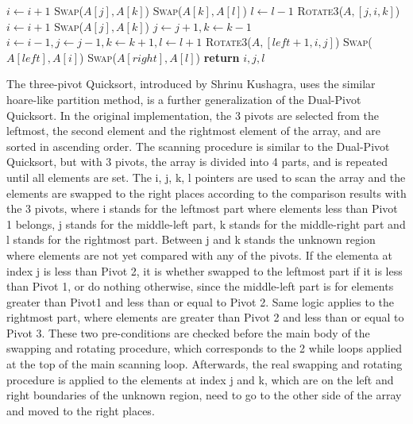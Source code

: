 \documentclass{article}
\begin{document}
\begin{algorithm}[H]
\begin{algorithmic}[1]
                        \State $i \gets i + 1$
                    \Else
                        \State \textsc{Swap}($A[j], A[k]$) 
                    \EndIf
                    \State \textsc{Swap}($A[k], A[l]$)
                    \State $l \gets l - 1$
                \Else {}
                        \State \textsc{Rotate3}($A, [j, i, k]$)
                        \State $i \gets i + 1$
                    \Else
                        \State \textsc{Swap}($A[j], A[k]$)
                    \EndIf
                \EndIf
                \State $j \gets j + 1, k \gets k - 1$
            \EndIf
        \EndWhile
        \State $i \gets i - 1, j \gets j - 1, k \gets k + 1, l \gets l + 1$
        \State \textsc{Rotate3}($A, [left + 1, i, j]$)
        \State \textsc{Swap}($A[left], A[i]$)
        \State \textsc{Swap}($A[right], A[l]$)
        \State \textbf{return} $i, j, l$
        \EndProcedure
    \end{algorithmic}
\end{algorithm}


The three-pivot Quicksort, introduced by Shrinu Kushagra, uses the similar hoare-like partition method, is a further generalization of the Dual-Pivot Quicksort.
In the original implementation, the 3 pivots are selected from the leftmost, the second element and the rightmost element of the array, and are sorted in ascending order.
The scanning procedure is similar to the Dual-Pivot Quicksort, but with 3 pivots, the array is divided into 4 parts, and is repeated until all elements are set.
The i, j, k, l pointers are used to scan the array and the elements are swapped to the right places according to the comparison results with the 3 pivots,
where i stands for the leftmost part where elements less than Pivot 1 belongs, j stands for the middle-left part, k stands for the middle-right part and l stands for the rightmost part.
Between j and k stands the unknown region where elements are not yet compared with any of the pivots. 
If the elementa at index j is less than Pivot 2, it is whether swapped to the leftmost part if it is less than Pivot 1,
or do nothing otherwise, since the middle-left part is for elements greater than Pivot1 and less than or equal to Pivot 2.
Same logic applies to the rightmost part, where elements are greater than Pivot 2 and less than or equal to Pivot 3.
These two pre-conditions are checked before the main body of the swapping and rotating procedure, which corresponds to the 2 while loops applied at the top of the main scanning loop.
Afterwards, the real swapping and rotating procedure is applied to the elements at index j and k, which are on the left and right boundaries of the unknown region, need to go to the other side of the array and moved to the right places.
\end{document}
